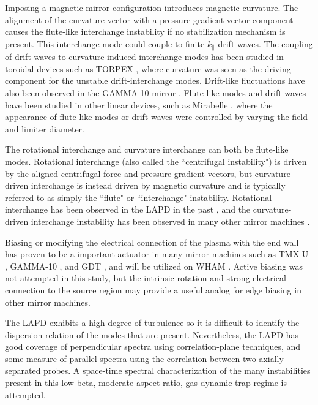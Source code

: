 Imposing a magnetic mirror configuration introduces magnetic curvature. The alignment of the curvature vector with a pressure gradient vector component causes the flute-like interchange instability if no stabilization mechanism is present. This interchange mode could couple to finite $k_\parallel$ drift waves. The coupling of drift waves to curvature-induced interchange modes has been studied in toroidal devices such as TORPEX \cite{Poli_experimental_2006, Fasoli_electrostatic_2006}, where curvature was seen as the driving component for the unstable drift-interchange modes. Drift-like fluctuations have also been observed in the GAMMA-10 mirror \cite{Mase_1991, Yoshikawa_2010}. Flute-like modes and drift waves have been studied in other linear devices, such as Mirabelle \cite{Brochard_transition_2005}, where the appearance of flute-like modes or drift waves were controlled by varying the field and limiter diameter. 

The rotational interchange and curvature interchange can both be flute-like modes. Rotational interchange (also called the ``centrifugal instability") is driven by the aligned centrifugal force and pressure gradient vectors, but curvature-driven interchange is instead driven by magnetic curvature and is typically referred to as simply the ``flute" or ``interchange" instability. Rotational interchange \cite{Jassby_transverse_1972} has been observed in the LAPD in the past \cite{Schaffner_2012, Schaffner_2013}, and the curvature-driven interchange instability has been observed in many other mirror machines \cite{wickham_curvature-induced_1982, ferron_interchange_1983, Post_1987}. 

Biasing or modifying the electrical connection of the plasma with the end wall has proven to be a important actuator in many mirror machines such as TMX-U \cite{Hooper_1984}, GAMMA-10 \cite{Mase_1991}, and GDT \cite{Bagryansky_2003, Bagryansky_2007, Beklemishev_2010}, and will be utilized on WHAM \cite{WHAM}. Active biasing was not attempted in this study, but the intrinsic rotation and strong electrical connection to the source region may provide a useful analog for edge biasing in other mirror machines.

The LAPD exhibits a high degree of turbulence so it is difficult to identify the dispersion relation of the modes that are present. Nevertheless, the LAPD has good coverage of perpendicular spectra using correlation-plane techniques, and some measure of parallel spectra using the correlation between two axially-separated probes. A space-time spectral characterization of the many instabilities present in this low beta, moderate aspect ratio, gas-dynamic trap regime is attempted.

